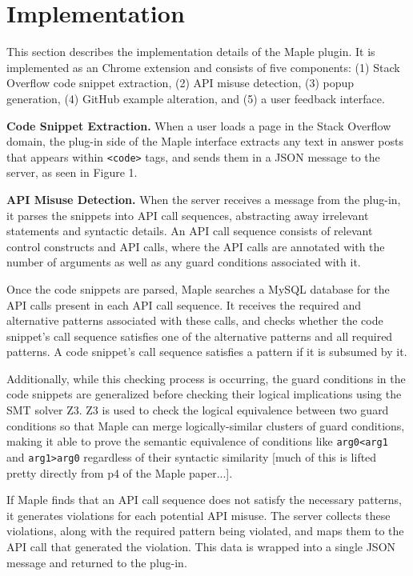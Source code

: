 \section{Implementation}
\label{sec:implementation}
This section describes the implementation details of the Maple plugin. It is implemented as an Chrome extension and consists of five components: (1) Stack Overflow code snippet extraction, (2) API misuse detection, (3) popup generation, (4) GitHub example alteration, and (5) a user feedback interface.

{\bf Code Snippet Extraction.} When a user loads a page in the Stack Overflow domain, the plug-in side of the Maple interface extracts any text in answer posts that appears within {\tt <code>} tags, and sends them in a JSON message to the server, as seen in Figure 1.

{\bf API Misuse Detection.} When the server receives a message from the plug-in, it parses the snippets into API call sequences, abstracting away irrelevant statements and syntactic details. An API call sequence consists of relevant control constructs and API calls, where the API calls are annotated with the number of arguments as well as any guard conditions associated with it.

Once the code snippets are parsed, Maple searches a MySQL database for the API calls present in each API call sequence. It receives the required and alternative patterns associated with these calls, and checks whether the code snippet's call sequence satisfies one of the alternative patterns and all required patterns. A code snippet's call sequence satisfies a pattern if it is subsumed by it.

Additionally, while this checking process is occurring, the guard conditions in the code snippets are generalized before checking their logical implications using the SMT solver Z3. Z3 is used to check the logical equivalence between two guard conditions so that Maple can merge logically-similar clusters of guard conditions, making it able to prove the semantic equivalence of conditions like {\tt arg0<arg1} and {\tt arg1>arg0} regardless of their syntactic similarity [much of this is lifted pretty directly from p4 of the Maple paper...].

If Maple finds that an API call sequence does not satisfy the necessary patterns, it generates violations for each potential API misuse. The server collects these violations, along with the required pattern being violated, and maps them to the API call that generated the violation. This data is wrapped into a single JSON message and returned to the plug-in.

